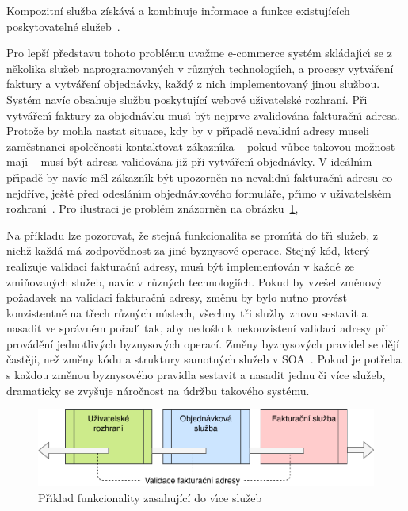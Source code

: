 \begin{definition}
    Kompozitní služba získává a kombinuje informace a funkce existujících poskytovatelné
    služeb~\cite{papazoglou2003service}.
\end{definition}

Pro lepší představu tohoto problému uvažme e-commerce systém
skládaj\'{\i}c\'{\i} se z několika služeb naprogramovan\'ych v různ\'ych technologi\'{\i}ch,
a procesy vytváření faktury a vytváření objednávky, každý z nich implementovaný jinou službou.
Systém navíc obsahuje službu poskytující webové uživatelské rozhraní.
Při vytvářen\'{\i} faktury za objednávku mus\'{\i} b\'yt nejprve zvalidována fakturačn\'{\i} adresa.
Protože by mohla nastat situace, kdy by v př\'{\i}padě nevalidn\'{\i} adresy museli zaměstnanci
společnosti kontaktovat zákazn\'{\i}ka -- pokud vůbec takovou možnost maj\'{\i}
-- musí být adresa validována již při vytvářen\'{\i} objednávky.
V ideáln\'{\i}m př\'{\i}padě by navíc měl zákazn\'{\i}k být upozorněn na nevalidn\'{\i} fakturačn\'{\i}
adresu co nejdříve, ještě před odeslán\'{\i}m objednávkového formuláře, př\'{\i}mo v uživatelském
rozhran\'{\i}~\cite{cemus2017separation}. Pro ilustraci je problém znázorněn na obrázku~\ref{fig:service-cutting},

Na příkladu lze pozorovat, že stejná funkcionalita se prom\'{\i}tá
do tř\'{\i} služeb, z nichž každá má zodpovědnost za jiné byznysové operace.
Stejn\'y kód, kter\'y realizuje validaci fakturačn\'{\i} adresy,
mus\'{\i} b\'yt implementován v každé ze zmiňovaných služeb, navíc v různých technologiích.
Pokud by vzešel změnový požadavek na validaci fakturačn\'{\i} adresy, změnu by bylo nutno
provést konzistentně na třech různ\'ych m\'{\i}stech, všechny tři služby znovu
sestavit a nasadit ve správném pořad\'{\i} tak, aby nedošlo k nekonzistení validaci adresy
při provádění jednotlivých byznysových operací. Změny byznysových pravidel se dějí častěji,
než změny kódu a struktury samotných služeb v \gls{SOA}~\cite{rosenberg2005business}.
Pokud je potřeba s každou změnou byznysového pravidla sestavit a nasadit jednu či více služeb,
dramaticky se zvyšuje náročnost na údržbu takového systému.

\begin{figure}
    \centering
    \includegraphics[keepaspectratio=true, width=0.8\linewidth]{figures/service-cutting.pdf}
    \caption{Př\'{\i}klad funkcionality zasahující do v\'{\i}ce služeb}
    \label{fig:service-cutting}
\end{figure}

